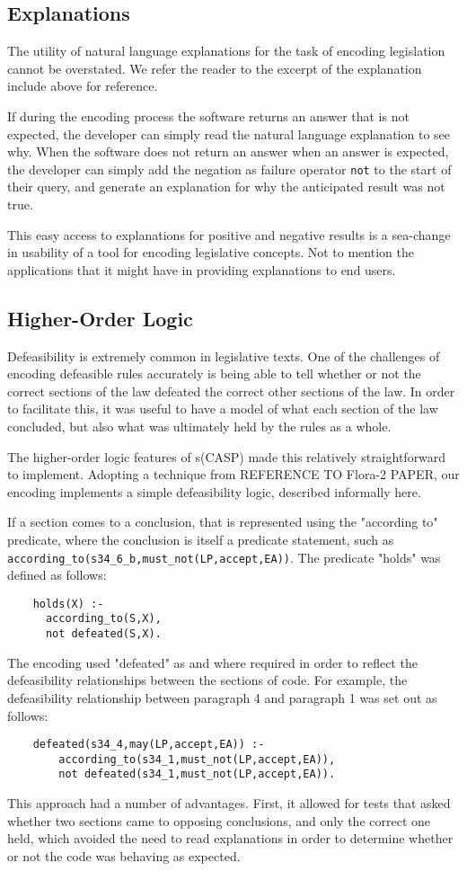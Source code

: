 \documentclass[sigconf]{acmart}
\begin{document}
\subsection{Explanations}
The utility of natural language explanations for the task of encoding legislation cannot be overstated. We refer the reader to the excerpt of the explanation
include above for reference.

If during the encoding process the software returns an answer that is not expected, the developer can simply read the natural language explanation
to see why. When the software does not return an answer when an answer is expected, the developer can simply add the
negation as failure operator \verb|not| to the start of their query, and generate an explanation for why the anticipated
result was not true.

This easy access to explanations for positive and negative results is a sea-change in usability of a tool for encoding legislative concepts. Not to mention the
applications that it might have in providing explanations to end users.

\subsection{Higher-Order Logic}

Defeasibility is extremely common in legislative texts. One of the challenges of encoding defeasible rules
accurately is being able to tell whether or not the correct sections of the law defeated the correct other
sections of the law. In order to facilitate this, it was useful to have a model of what each section
of the law concluded, but also what was ultimately held by the rules as a whole.

The higher-order logic features of s(CASP) made this relatively straightforward to implement. Adopting a
technique from REFERENCE TO Flora-2 PAPER, our encoding implements a simple defeasibility logic, described
informally here.

If a section comes to a conclusion, that is represented using the "according to" predicate,
where the conclusion is itself a predicate statement, such as
\verb|according_to(s34_6_b,must_not(LP,accept,EA))|.
The predicate "holds" was defined as follows:
\begin{lstlisting}
    holds(X) :- 
      according_to(S,X),
      not defeated(S,X).
\end{lstlisting}
The encoding used "defeated" as and where required in order to reflect the defeasibility relationships
between the sections of code. For example, the defeasibility relationship between paragraph 4 and
paragraph 1 was set out as follows:
\begin{lstlisting}
    defeated(s34_4,may(LP,accept,EA)) :-
        according_to(s34_1,must_not(LP,accept,EA)),
        not defeated(s34_1,must_not(LP,accept,EA)).
\end{lstlisting}
This approach had a number of advantages. First, it allowed for tests that asked whether two sections
came to opposing conclusions, and only the correct one held, which avoided the need to read explanations
in order to determine whether or not the code was behaving as expected.
\end{document}
